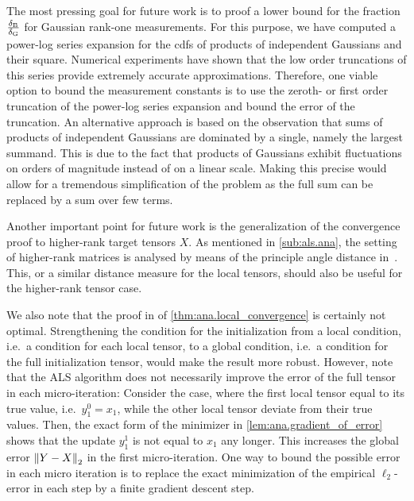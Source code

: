 The most pressing goal for future work is to proof a lower bound for the fraction $\frac{\delta_\mathrm{B}}{\delta_\mathrm{G}}$ for Gaussian rank-one measurements.
For this purpose, we have computed a power-log series expansion for the cdfs of products of independent Gaussians and their square.
Numerical experiments have shown that the low order truncations of this series provide extremely accurate approximations.
Therefore, one viable option to bound the measurement constants is to use the zeroth- or first order truncation of the power-log series expansion and bound the error of the truncation.
An alternative approach is based on the observation that sums of products of independent Gaussians are dominated by a single, namely the largest summand.
This is due to the fact that products of Gaussians exhibit fluctuations on orders of magnitude instead of on a linear scale.
Making this precise would allow for a tremendous simplification of the problem as the full sum can be replaced by a sum over few terms.

Another important point for future work is the generalization of the convergence proof to higher-rank target tensors $X$.
As mentioned in \cref{sub:als.ana}, the setting of higher-rank matrices is analysed by means of the principle angle distance in~\cite{Zhong_2015_Efficient}.
This, or a similar distance measure for the local tensors, should also be useful for the higher-rank tensor case.

We also note that the proof in of \cref{thm:ana.local_convergence} is certainly not optimal.
Strengthening the condition for the initialization from a local condition, i.e.\ a condition for each local tensor, to a global condition, i.e.\ a condition for the full initialization tensor, would make the result more robust.
However, note that the ALS algorithm does not necessarily improve the error of the full tensor in each micro-iteration:
Consider the case, where the first local tensor equal to its true value, i.e.\ $y_1^0 = x_1$, while the other local tensor deviate from their true values.
Then, the exact form of the minimizer in \cref{lem:ana.gradient_of_error} shows that the update $y_1^1$ is not equal to $x_1$ any longer.
This increases the global error ${\left\Vert Y - X\right\Vert}_{2}$ in the first micro-iteration.
One way to bound the possible error in each micro iteration is to replace the exact minimization of the empirical $\ell_2$-error in each step by a finite gradient descent step.

